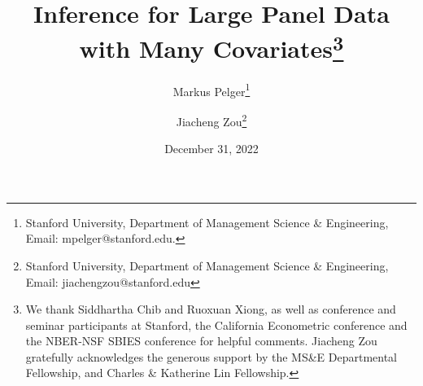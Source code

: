 \documentclass[11pt]{article}
\begin{document}
	
	\title{Inference for Large Panel Data with Many Covariates\thanks{\scriptsize We thank Siddhartha Chib
			and Ruoxuan Xiong, as well as conference and seminar participants at Stanford, the California Econometric conference and the NBER-NSF SBIES conference for helpful comments. Jiacheng Zou gratefully acknowledges the generous support by the MS\&E Departmental Fellowship, and Charles \& Katherine Lin Fellowship.}}
	
	\date{December 31, 2022}
	\author{Markus Pelger\thanks{\scriptsize Stanford University, Department of Management Science \& Engineering, Email: mpelger@stanford.edu.}
		\and
		Jiacheng Zou\thanks{\scriptsize Stanford University, Department of Management Science \& Engineering, Email: jiachengzou@stanford.edu}
	}
	
	
	\onehalfspacing
	
\end{document}
